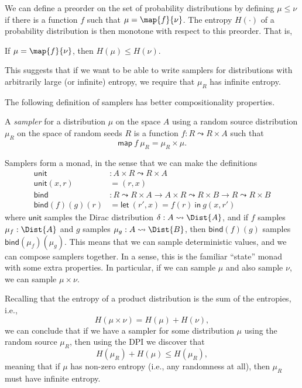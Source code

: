 We can define a preorder on the set of probability distributions by defining $\mu \le \nu$ if there is a function $f$ such that $\mu = \map{f}{\nu}$. The entropy $H(\cdot)$ of a probability distribution is then monotone with respect to this preorder. That is,
\begin{theorem}
If $\mu = \map{f}{\nu}$, then $H(\mu) \le H(\nu)$.
\end{theorem}
This suggests that if we want to be able to write samplers for distributions with arbitrarily large (or infinite) entropy, we require that $\mu_R$ has infinite entropy.

The following definition of samplers has better compositionality properties.
\begin{definition}
A \emph{sampler} for a distribution $\mu$ on the space $A$ using a random source distribution $\mu_R$ on the space of random seeds $R$ is a function $ f : R \leadsto R \times A$ such that
\[
  \mathsf{map}\ f \ \mu_R = \mu_R \times \mu.
\]
\end{definition}

Samplers form a monad, in the sense that we can make the definitions
\begin{align*}
\mathsf{unit} &: A \times R \leadsto R \times A
\\ \mathsf{unit}(x, r) &= (r, x)
\\ \mathsf{bind} &: R \leadsto R \times A \to A \times R \leadsto R \times B
  \to R \leadsto R \times B
\\ \mathsf{bind}(f)(g)(r) &= \mathsf{let}\ (r', x) = f(r)\ \mathsf{in}\ g(x, r')
\end{align*}
where $\mathsf{unit}$ samples the Dirac distribution $\delta : A \leadsto \Dist{A}$,
and if $f$ samples $\mu_f : \Dist{A}$ and $g$ samples $\mu_g : A \leadsto \Dist{B}$, then $\mathsf{bind}(f)(g)$ samples $\mathsf{bind}(\mu_f)(\mu_g)$. This means that we can sample deterministic values, and we can compose samplers together. In a sense, this is the familiar ``state'' monad with some extra properties. In particular, if we can sample $\mu$ and also sample $\nu$, we can sample $\mu \times \nu$.

Recalling that the entropy of a product distribution is the sum of the entropies, i.e.,
\[
H(\mu \times \nu) = H(\mu) + H(\nu),
\]
we can conclude that if we have a sampler for some distribution $\mu$ using the random source $\mu_R$, then using the DPI we discover that
\[
H(\mu_R) + H(\mu) \le H(\mu_R),
\]
meaning that if $\mu$ has non-zero entropy (i.e., any randomness at all), then $\mu_R$ must have infinite entropy.

